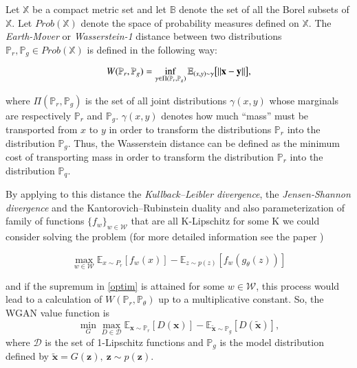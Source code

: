 \documentclass{webofc}
\newcommand{\vx}{\mathbf{x}}
\newcommand{\vz}{\mathbf{z}}
\begin{document}
Let $\mathbb{X}$ be a compact metric set and let $\mathbb{B}$ denote the set of all the Borel subsets of $\mathbb{X}$. Let $Prob(\mathbb{X})$ denote the space of probability measures defined on $\mathbb{X}$. The \emph{Earth-Mover} or \emph{Wasserstein-1} distance between two distributions $\mathbb{P}_r, \mathbb{P}_g \in Prob(\mathbb{X})$ is defined in the following way:

\begin{equation}\label{wasserstein_metric}
W(\mathbb{P}_r, \mathbb{P}_g) = \inf_{\gamma \in \Pi(\mathbb{P}_r, \mathbb{P}_g)} \mathbb{E}_{(x, y) \sim \gamma} \big{[}\|\vx-\textbf{y}\|\big{]},
\end{equation}

where $\Pi(\mathbb{P}_r, \mathbb{P}_g)$ is the set of all joint distributions $\gamma(x, y)$ whose marginals are respectively $\mathbb{P}_r$ and $\mathbb{P}_g$. $\gamma(x, y)$ denotes how much “mass” must be transported from $x$ to $y$ in order to transform the distributions $\mathbb{P}_r$ into the distribution $\mathbb{P}_g$. Thus, the Wasserstein distance can be defined as the minimum cost of transporting mass in order to transform the distribution $\mathbb{P}_r$ into the distribution $\mathbb{P}_q$. 

By applying to this distance the \emph{Kullback--Leibler divergence}, the \emph{Jensen-Shannon divergence} and the Kantorovich--Rubinstein duality and also parameterization of family of functions $\{f_w\}_{w \in \mathcal{W}}$ that are all K-Lipschitz for some K we could consider solving the problem (for more detailed information see the paper \cite{arjovsky2017wasserstein})

\begin{equation}\label{optim}
\max_{w \in \mathcal{W}} \mathbb{E}_{x \sim P_r}[f_w(x)] - \mathbb{E}_{z\sim p(z)} [f_w(g_\theta(z))]
\end{equation}

and if the supremum in \eqref{optim} is attained for some $w \in \mathcal{W}$, this process would lead to a calculation of $W(\mathbb{P}_r, \mathbb{P}_\theta)$ up to a multiplicative constant.
So, the WGAN value function is
\begin{equation}\label{wgan_loss}
\min_G \max_{D \in \mathcal{D}}  \mathbb{E}_{\vx \sim \mathbb{P}_r}  [D(\vx)] - \mathbb{E}_{\tilde{\vx} \sim \mathbb{P}_g} [D(\tilde{\vx})],
\end{equation}
where $\mathcal{D}$ is the set of 1-Lipschitz functions and $\mathbb{P}_g$ is  the model distribution defined by $\tilde{\vx} = G(\vz), ~\vz \sim p(\vz).$
\end{document}
